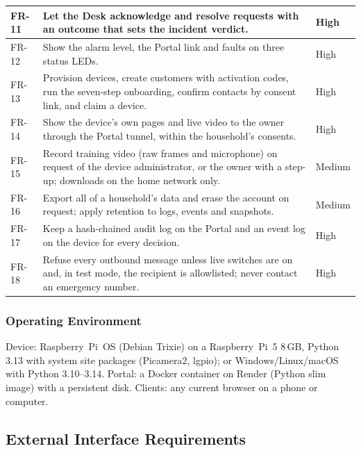 \begin{longtable}{|C{1.0cm}|L{10.4cm}|C{1.6cm}|}
FR-11 & Let the Desk acknowledge and resolve requests with an outcome that sets the incident verdict. & High\\ \hline
FR-12 & Show the alarm level, the Portal link and faults on three status LEDs. & High\\ \hline
FR-13 & Provision devices, create customers with activation codes, run the seven-step onboarding, confirm contacts by consent link, and claim a device. & High\\ \hline
FR-14 & Show the device's own pages and live video to the owner through the Portal tunnel, within the household's consents. & High\\ \hline
FR-15 & Record training video (raw frames and microphone) on request of the device administrator, or the owner with a step-up; downloads on the home network only. & Medium\\ \hline
FR-16 & Export all of a household's data and erase the account on request; apply retention to logs, events and snapshots. & Medium\\ \hline
FR-17 & Keep a hash-chained audit log on the Portal and an event log on the device for every decision. & High\\ \hline
FR-18 & Refuse every outbound message unless live switches are on and, in test mode, the recipient is allowlisted; never contact an emergency number. & High\\ \hline
\end{longtable}
\endgroup

\subsubsection{Operating Environment}
Device: Raspberry~Pi~OS (Debian Trixie) on a Raspberry~Pi~5 8\,GB, Python 3.13 with system site packages (Picamera2, lgpio); or Windows/Linux/macOS with Python 3.10--3.14. Portal: a Docker container on Render (Python slim image) with a persistent disk. Clients: any current browser on a phone or computer.

\subsection{External Interface Requirements}
